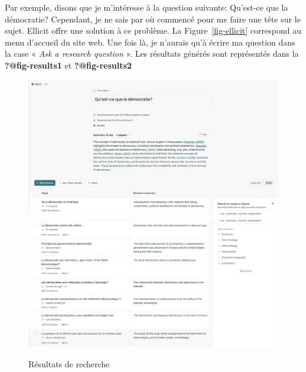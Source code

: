 \documentclass[
  letterpaper,
]{scrbook}
\begin{document}
Par exemple, disons que je m'intéresse à la question suivante: Qu'est-ce
que la démocratie? Cependant, je ne sais par où commencé pour me faire
une tête sur le sujet. Ellicit offre une solution à ce problème. La
Figure~\ref{fig-ellicit} correspond au menu d'accueil du site web. Une
fois là, je n'aurais qu'à écrire ma question dans la case « \emph{Ask a
research question} ». Les résultats générés sont représentés dans la
\textbf{?@fig-results1} et \textbf{?@fig-results2}

\begin{figure}

\begin{minipage}[t]{0.50\linewidth}

{\centering 

\includegraphics{images/chapitre9_image3.jpeg}
\includegraphics{images/chapitre9_image4.jpeg}

}

\end{minipage}%
%
\begin{minipage}[t]{0.50\linewidth}

{\centering 

Résultats de recherche

}

\end{minipage}%

\end{figure}
\end{document}
